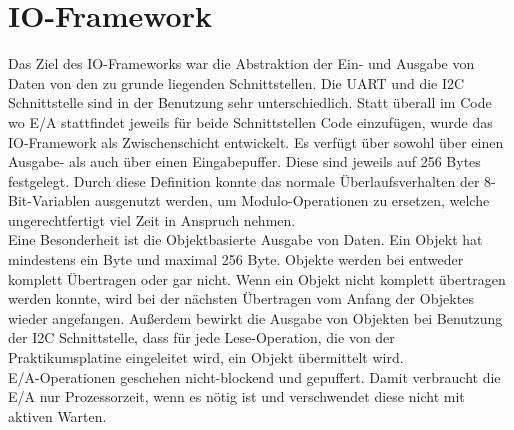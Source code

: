 \section{IO-Framework}
Das Ziel des IO-Frameworks war die Abstraktion der Ein- und Ausgabe von Daten von den zu grunde liegenden Schnittstellen.
Die UART und die I2C Schnittstelle sind in der Benutzung sehr unterschiedlich. Statt überall im Code wo E/A stattfindet
jeweils für beide Schnittstellen Code einzufügen, wurde das IO-Framework als Zwischenschicht entwickelt. Es verfügt über sowohl
über einen Ausgabe- als auch über einen Eingabepuffer. Diese sind jeweils auf 256 Bytes festgelegt. Durch diese Definition
konnte das normale Überlaufsverhalten der 8-Bit-Variablen ausgenutzt werden, um Modulo-Operationen zu ersetzen, welche
ungerechtfertigt viel Zeit in Anspruch nehmen.\\
Eine Besonderheit ist die Objektbasierte Ausgabe von Daten. Ein Objekt hat mindestens ein Byte und maximal 256 Byte. Objekte
werden bei entweder komplett Übertragen oder gar nicht. Wenn ein Objekt nicht komplett übertragen werden konnte, wird bei der
nächsten Übertragen vom Anfang der Objektes wieder angefangen. Außerdem bewirkt die Ausgabe von Objekten bei Benutzung der I2C 
Schnittstelle, dass für jede Lese-Operation, die von der Praktikumsplatine eingeleitet wird, ein Objekt übermittelt wird.\\
E/A-Operationen geschehen nicht-blockend und gepuffert. Damit verbraucht die E/A nur Prozessorzeit, wenn es nötig ist und
verschwendet diese nicht mit aktiven Warten.
